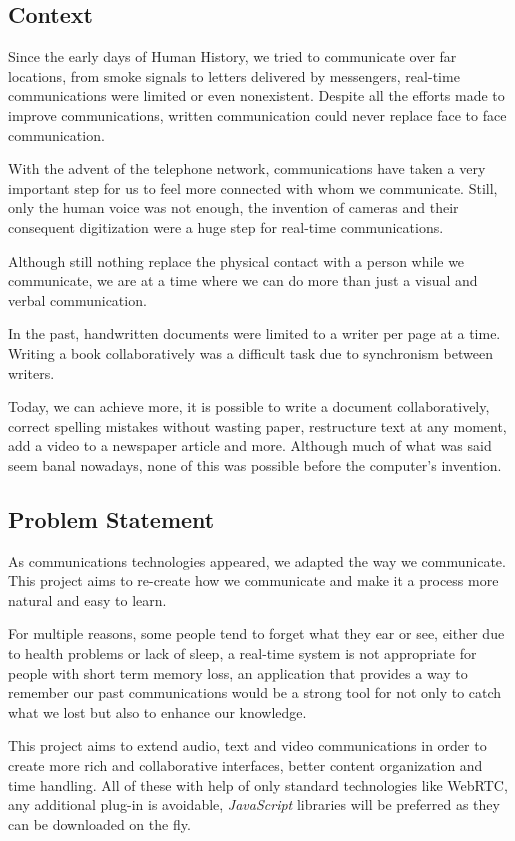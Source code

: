 \subsection{Context}   %
 	Since the early days of Human History, we tried to communicate over far locations, from smoke signals to letters delivered by messengers, real-time communications were limited or even nonexistent. Despite all the efforts made to improve communications, written communication could never replace face to face communication.

	With the advent of the telephone network, communications have taken a very important step for us to feel more connected with whom we communicate. Still, only the human voice was not enough, the invention of cameras and their consequent digitization were a huge step for real-time communications.

 	Although still nothing replace the physical contact with a person while we communicate, we are at a time where we can do more than just a visual and verbal communication.
 	
	In the past, handwritten documents were limited to a writer per page at a time. Writing a book collaboratively was a difficult task due to synchronism between writers.

	Today, we can achieve more, it is possible to write a document collaboratively, correct spelling mistakes without wasting paper, restructure text at any moment, add a video to a newspaper article and more. Although much of what was said seem banal nowadays, none of this was possible before the computer's invention. 

\subsection{Problem Statement} %

	As communications technologies appeared, we adapted the way we communicate. This project aims to re-create how we communicate and make it a process more natural and easy to learn. 

	For multiple reasons, some people tend to forget what they ear or see, either due to health problems or lack of sleep, a real-time system is not appropriate for people with short term memory loss, an application that provides a way to remember our past communications would be a strong tool for not only to catch what we lost but also to enhance our knowledge.

	This project aims to extend audio, text and video communications in order to create more rich and collaborative interfaces, better content organization and time handling. All of these with help of only standard technologies like \ac{WebRTC}, any additional plug-in is avoidable, \emph{JavaScript} libraries will be preferred as they can be downloaded on the fly.  

